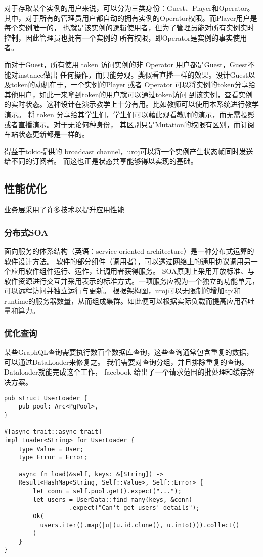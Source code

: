 对于存取某个实例的用户来说，可以分为三类身份：Guest、Player和Operator。
其中，对于所有的管理员用户都自动的拥有实例的Operator权限。而Player用户是每个实例唯一的，
也就是该实例的逻辑使用者，但为了管理员能对所有实例实时控制，因此管理员也拥有一个实例的
所有权限，即Operator是实例的事实使用者。

而对于Guest，所有使用 token 访问实例的非 Operator 用户都是Guest，Guest不能对instance做出
任何操作，而只能旁观。类似看直播一样的效果。设计Guest以及token的动机在于，一个实例的Player
或者 Operator 可以将实例的token分享给其他用户，如此一来拿到token的用户就可以通过token访问
到该实例，查看实例的实时状态。这种设计在演示教学上十分有用。比如教师可以使用本系统进行教学演示。
将 token 分享给其学生们，学生们可以藉此观看教师的演示，而无需投影或者直播演示。对于无论何种身份，
其区别只是Mutation的权限有区别，而订阅车站状态更新都是一样的。

得益于tokio提供的 broadcast channel，uroj可以将一个实例产生状态帧同时发送给不同的订阅者。
而这也正是状态共享能够得以实现的基础。

\subsection{性能优化}
业务层采用了许多技术以提升应用性能
\subsubsection{分布式SOA}
面向服务的体系结构（英语：service-oriented architecture）是一种分布式运算的软件设计方法。
软件的部分组件（调用者），可以透过网络上的通用协议调用另一个应用软件组件运行、运作，让调用者获得服务。
SOA原则上采用开放标准、与软件资源进行交互并采用表示的标准方式。一项服务应视为一个独立的功能单元，可以远程访问并独立运行与更新。
根据架构图，uroj可以无限制的增加api和runtime的服务器数量，从而组成集群。如此便可以根据实际负载而提高应用吞吐量和算力。
\subsubsection{优化查询}
某些GraphQL查询需要执行数百个数据库查询，这些查询通常包含重复的数据，可以通过DataLoader来修复之。
我们需要对查询分组，并且排除重复的查询。Dataloader就能完成这个工作，
facebook 给出了一个请求范围的批处理和缓存解决方案。
\begin{lstlisting}
pub struct UserLoader {
    pub pool: Arc<PgPool>,
}

#[async_trait::async_trait]
impl Loader<String> for UserLoader {
    type Value = User;
    type Error = Error;

    async fn load(&self, keys: &[String]) -> 
    Result<HashMap<String, Self::Value>, Self::Error> {
        let conn = self.pool.get().expect("...");
        let users = UserData::find_many(keys, &conn)
                  .expect("Can't get users' details");
        Ok(
          users.iter().map(|u|(u.id.clone(), u.into())).collect()
        )
    }
}
\end{lstlisting}

